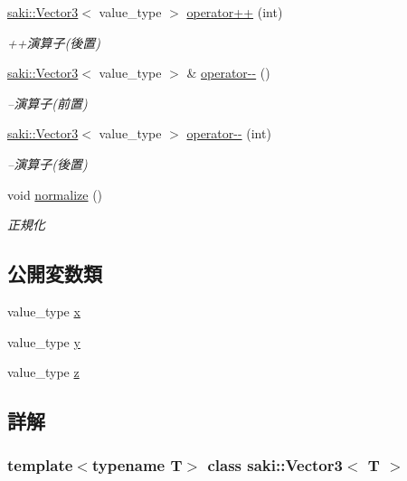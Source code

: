 \begin{DoxyCompactItemize}
\mbox{\hyperlink{classsaki_1_1_vector3}{saki\+::\+Vector3}}$<$ value\+\_\+type $>$ \mbox{\hyperlink{classsaki_1_1_vector3_a04791f1471c7b858ee54f5dbe05d6bc6}{operator++}} (int)
\begin{DoxyCompactList}\small\item\em ++演算子(後置) \end{DoxyCompactList}\item 
\mbox{\hyperlink{classsaki_1_1_vector3}{saki\+::\+Vector3}}$<$ value\+\_\+type $>$ \& \mbox{\hyperlink{classsaki_1_1_vector3_abdb5c984e59deedd88b76d3530098a44}{operator-\/-\/}} ()
\begin{DoxyCompactList}\small\item\em --演算子(前置) \end{DoxyCompactList}\item 
\mbox{\hyperlink{classsaki_1_1_vector3}{saki\+::\+Vector3}}$<$ value\+\_\+type $>$ \mbox{\hyperlink{classsaki_1_1_vector3_aca7964efb09798828f3b8150c76609a6}{operator-\/-\/}} (int)
\begin{DoxyCompactList}\small\item\em --演算子(後置) \end{DoxyCompactList}\item 
void \mbox{\hyperlink{classsaki_1_1_vector3_a7b9496274bab6ea6147e6a09e1493110}{normalize}} ()
\begin{DoxyCompactList}\small\item\em 正規化 \end{DoxyCompactList}\end{DoxyCompactItemize}
\subsection*{公開変数類}
\begin{DoxyCompactItemize}
\item 
value\+\_\+type \mbox{\hyperlink{classsaki_1_1_vector3_ab33de1bb371f0175349847e95cee081d}{x}}
\item 
value\+\_\+type \mbox{\hyperlink{classsaki_1_1_vector3_add21d7ee62c5dbc05fda72ae06633a1b}{y}}
\item 
value\+\_\+type \mbox{\hyperlink{classsaki_1_1_vector3_a367fbb31983a92e64852970edf9a315e}{z}}
\end{DoxyCompactItemize}


\subsection{詳解}
\subsubsection*{template$<$typename T$>$\newline
class saki\+::\+Vector3$<$ T $>$}

